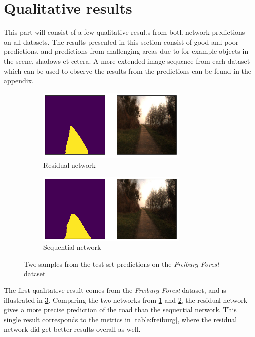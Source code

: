 \documentclass[USenglish]{ifimaster}  %
\begin{document}
\section{Qualitative results}
This part will consist of a few qualitative results from both network predictions on all datasets. The results presented in this section consist of good and poor predictions, and predictions from challenging areas due to for example objects in the scene, shadows et cetera. A more extended image sequence from each dataset which can be used to observe the results from the predictions can be found in the appendix.

\begin{figure}[ht]
\centering
\begin{subfigure}[b]{\textwidth}
\centering
\includegraphics[width=0.8\textwidth]{bilder/freiburg/b57-8406_Clipped_res.png}
\caption{Residual network}
\label{fig:ff_res}
\end{subfigure}
\hfill
\begin{subfigure}[b]{\textwidth}
\centering
\includegraphics[width=0.8\textwidth]{bilder/freiburg/b57-8406_Clipped_seq.png}
\caption{Sequential network}
\label{fig:ff_seq}
\end{subfigure}
\caption{Two samples from the test set predictions on the
\textit{Freiburg Forest} dataset}
\label{fig:ff_result}
\end{figure}
The first qualitative result comes from the \textit{Freiburg Forest} dataset, and is illustrated in \cref{fig:ff_result}. Comparing the two networks from \cref{fig:ff_res} and \cref{fig:ff_seq}, the residual network gives a more precise prediction of the road than the sequential network. This single result corresponds to the metrics in \cref{table:freiburg}, where the residual network did get better results overall as well. 
\end{document}
